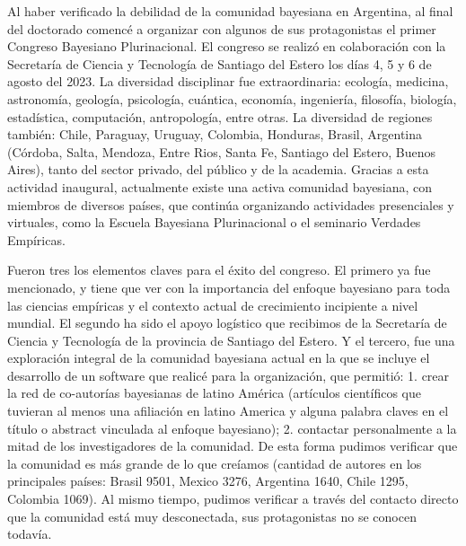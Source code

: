 \documentclass[a4paper,11pt]{book}
\theoremstyle{definition}
\begin{document}

Al haber verificado la debilidad de la comunidad bayesiana en Argentina, al final del doctorado comencé a organizar con algunos de sus protagonistas el primer Congreso Bayesiano Plurinacional.
%
El congreso se realizó en colaboración con la Secretaría de Ciencia y Tecnología de Santiago del Estero los días 4, 5 y 6 de agosto del 2023.
%
La diversidad disciplinar fue extraordinaria: ecología, medicina, astronomía, geología, psicología, cuántica, economía, ingeniería, filosofía, biología, estadística, computación, antropología, entre otras.
%
La diversidad de regiones también: Chile, Paraguay, Uruguay, Colombia, Honduras, Brasil, Argentina (Córdoba, Salta, Mendoza, Entre Rios, Santa Fe, Santiago del Estero, Buenos Aires), tanto del sector privado, del público y de la academia.
%
Gracias a esta actividad inaugural, actualmente existe una activa comunidad bayesiana, con miembros de diversos países, que continúa organizando actividades presenciales y virtuales, como la Escuela Bayesiana Plurinacional o el seminario Verdades Empíricas.


Fueron tres los elementos claves para el éxito del congreso.
%
El primero ya fue mencionado, y tiene que ver con la importancia del enfoque bayesiano para toda las ciencias empíricas y el contexto actual de crecimiento incipiente a nivel mundial.
%
El segundo ha sido el apoyo logístico que recibimos de la Secretaría de Ciencia y Tecnología de la provincia de Santiago del Estero.
%
Y el tercero, fue una exploración integral de la comunidad bayesiana actual en la que se incluye el desarrollo de un software que realicé para la organización, que permitió: 1. crear la red de co-autorías bayesianas de latino América (artículos científicos que tuvieran al menos una afiliación en latino America y alguna palabra claves en el título o abstract vinculada al enfoque bayesiano); 2. contactar personalmente a la mitad de los investigadores de la comunidad.
%
De esta forma pudimos verificar que la comunidad es más grande de lo que creíamos (cantidad de autores en los principales países: Brasil 9501, Mexico 3276, Argentina 1640, Chile 1295, Colombia 1069).
%
Al mismo tiempo, pudimos verificar a través del contacto directo que la comunidad está muy desconectada, sus protagonistas no se conocen todavía.

\end{document}
